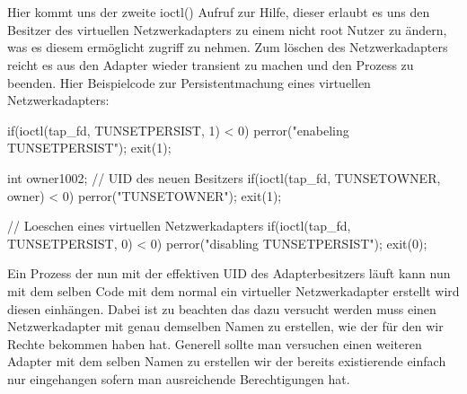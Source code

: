 \\\\
Hier kommt uns der zweite ioctl() Aufruf zur Hilfe, dieser erlaubt es uns den Besitzer des virtuellen Netzwerkadapters zu einem nicht root Nutzer zu ändern, was es diesem ermöglicht zugriff zu nehmen. Zum löschen des Netzwerkadapters reicht es aus den Adapter wieder transient zu machen und den Prozess zu beenden. Hier Beispielcode zur Persistentmachung eines virtuellen Netzwerkadapters:
\begin{program}[H]
    \begin{CppCode}
        if(ioctl(tap_fd, TUNSETPERSIST, 1) < 0){
            perror("enabeling TUNSETPERSIST");
            exit(1);
        }
        
        int owner{1002}; // UID des neuen Besitzers
        if(ioctl(tap_fd, TUNSETOWNER, owner) < 0){
            perror("TUNSETOWNER");
            exit(1);
        }

        // Loeschen eines virtuellen Netzwerkadapters
        if(ioctl(tap_fd, TUNSETPERSIST, 0) < 0){
            perror("disabling TUNSETPERSIST");
        }
        exit(0);
    \end{CppCode}
\end{program}
\noindent
Ein Prozess der nun mit der effektiven UID des Adapterbesitzers läuft kann nun mit dem selben Code mit dem normal ein virtueller Netzwerkadapter erstellt wird diesen einhängen. Dabei ist zu beachten das dazu versucht werden muss einen Netzwerkadapter mit genau demselben Namen zu erstellen, wie der für den wir Rechte bekommen haben hat. Generell sollte man versuchen einen weiteren Adapter mit dem selben Namen zu erstellen wir der bereits existierende einfach nur eingehangen sofern man ausreichende Berechtigungen hat.

